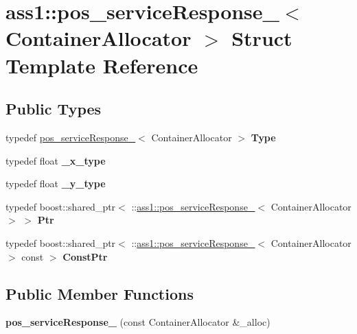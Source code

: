 \hypertarget{structass1_1_1pos__serviceResponse__}{}\section{ass1\+:\+:pos\+\_\+service\+Response\+\_\+$<$ Container\+Allocator $>$ Struct Template Reference}
\label{structass1_1_1pos__serviceResponse__}
\subsection*{Public Types}
\begin{DoxyCompactItemize}
\item 
\mbox{\label{structass1_1_1pos__serviceResponse___a65aae814dd3aa3159f62aec067e17074}} 
typedef \hyperlink{structass1_1_1pos__serviceResponse__}{pos\+\_\+service\+Response\+\_\+}$<$ Container\+Allocator $>$ {\bfseries Type}
\item 
\mbox{\label{structass1_1_1pos__serviceResponse___a827db5d13db781a7f5ef5b32f67523a4}} 
typedef float {\bfseries \+\_\+x\+\_\+type}
\item 
\mbox{\label{structass1_1_1pos__serviceResponse___a4f027fe98c794f170a217a8d444f2ace}} 
typedef float {\bfseries \+\_\+y\+\_\+type}
\item 
\mbox{\label{structass1_1_1pos__serviceResponse___a00c539cf327f6afbe781e1c8ed4fa13a}} 
typedef boost\+::shared\+\_\+ptr$<$ \+::\hyperlink{structass1_1_1pos__serviceResponse__}{ass1\+::pos\+\_\+service\+Response\+\_\+}$<$ Container\+Allocator $>$ $>$ {\bfseries Ptr}
\item 
\mbox{\label{structass1_1_1pos__serviceResponse___a43ed9107a39dedb75d3148a96b145b22}} 
typedef boost\+::shared\+\_\+ptr$<$ \+::\hyperlink{structass1_1_1pos__serviceResponse__}{ass1\+::pos\+\_\+service\+Response\+\_\+}$<$ Container\+Allocator $>$ const  $>$ {\bfseries Const\+Ptr}
\end{DoxyCompactItemize}
\subsection*{Public Member Functions}
\begin{DoxyCompactItemize}
\item 
\mbox{\label{structass1_1_1pos__serviceResponse___ae91a1f74006e909aaac8472e251645cc}} 
{\bfseries pos\+\_\+service\+Response\+\_\+} (const Container\+Allocator \&\+\_\+alloc)
\end{DoxyCompactItemize}
